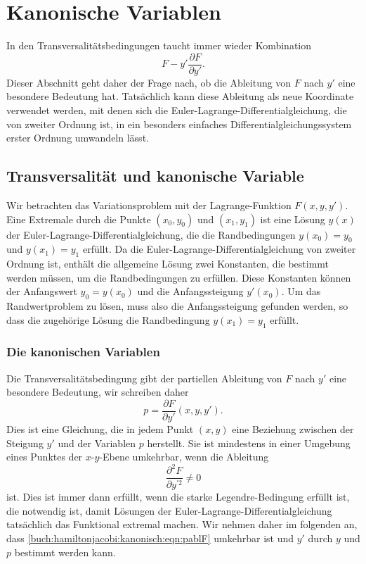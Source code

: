 %
%
%
\section{Kanonische Variablen
\label{buch:hamiltonjacobi:section:kanonisch}}
In den Transversalitätsbedingungen taucht immer wieder Kombination
\[
F - y'\frac{\partial F}{\partial y'}.
\]
Dieser Abschnitt geht daher der Frage nach, ob die Ableitung von
$F$ nach $y'$ eine besondere Bedeutung hat.
Tatsächlich kann diese Ableitung als neue Koordinate verwendet
werden, mit denen sich die Euler-Lagrange-Differentialgleichung, die
von zweiter Ordnung ist, in ein besonders einfaches
Differentialgleichungssystem erster Ordnung umwandeln lässt.

%
%
\subsection{Transversalität und kanonische Variable}
Wir betrachten das Variationsproblem mit der Lagrange-Funktion
$F(x,y,y')$.
Eine Extremale durch die Punkte $(x_0,y_0)$ und $(x_1,y_1)$ ist
eine Lösung $y(x)$ der Euler-Lagrange-Differentialgleichung, die die
Randbedingungen $y(x_0)=y_0$ und $y(x_1)=y_1$ erfüllt.
Da die Euler-Lagrange-Differentialgleichung von zweiter Ordnung ist,
enthält die allgemeine Lösung zwei Konstanten, die bestimmt werden 
müssen, um die Randbedingungen zu erfüllen.
Diese Konstanten können der Anfangswert $y_0=y(x_0)$ und die Anfangssteigung
$y'(x_0)$.
Um das Randwertproblem zu lösen, muss also die Anfangssteigung gefunden
werden, so dass die zugehörige Lösung die Randbedingung $y(x_1)=y_1$ 
erfüllt.

%
%
\subsubsection{Die kanonischen Variablen}
Die Transversalitätsbedingung gibt der partiellen Ableitung von $F$
nach $y'$ eine besondere Bedeutung, wir schreiben daher 
\begin{equation}
p = \frac{\partial F}{\partial y'}(x,y,y').
\label{buch:hamiltonjacobi:kanonisch:eqn:pablF}
\end{equation}
Dies ist eine Gleichung, die in jedem Punkt $(x,y)$ eine Beziehung 
zwischen der Steigung $y'$ und der Variablen $p$ herstellt.
Sie ist mindestens in einer Umgebung eines Punktes der $x$-$y$-Ebene
umkehrbar, wenn die Ableitung
\[
\frac{\partial^2 F}{\partial y^{\prime 2}}
\ne 0
\]
ist.
Dies ist immer dann erfüllt, wenn die starke Legendre-Bedingung
erfüllt ist, die notwendig ist, damit Lösungen der
Euler-Lagrange-Differentialgleichung tatsächlich das Funktional
extremal machen.
Wir nehmen daher im folgenden an, dass 
\eqref{buch:hamiltonjacobi:kanonisch:eqn:pablF}
umkehrbar ist und $y'$ durch $y$ und $p$ bestimmt werden kann.

